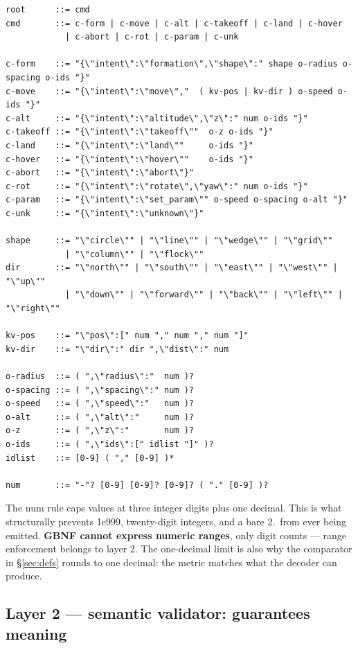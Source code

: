\documentclass[11pt,a4paper]{article}
\newcommand{\code}[1]{{\ttfamily\small #1}}
\begin{document}
\begin{lstlisting}[caption={cmd.gbnf --- the grammar that constrains decoding},captionpos=b]
root      ::= cmd
cmd       ::= c-form | c-move | c-alt | c-takeoff | c-land | c-hover
            | c-abort | c-rot | c-param | c-unk

c-form    ::= "{\"intent\":\"formation\",\"shape\":" shape o-radius o-spacing o-ids "}"
c-move    ::= "{\"intent\":\"move\","  ( kv-pos | kv-dir ) o-speed o-ids "}"
c-alt     ::= "{\"intent\":\"altitude\",\"z\":" num o-ids "}"
c-takeoff ::= "{\"intent\":\"takeoff\""  o-z o-ids "}"
c-land    ::= "{\"intent\":\"land\""     o-ids "}"
c-hover   ::= "{\"intent\":\"hover\""    o-ids "}"
c-abort   ::= "{\"intent\":\"abort\"}"
c-rot     ::= "{\"intent\":\"rotate\",\"yaw\":" num o-ids "}"
c-param   ::= "{\"intent\":\"set_param\"" o-speed o-spacing o-alt "}"
c-unk     ::= "{\"intent\":\"unknown\"}"

shape     ::= "\"circle\"" | "\"line\"" | "\"wedge\"" | "\"grid\""
            | "\"column\"" | "\"flock\""
dir       ::= "\"north\"" | "\"south\"" | "\"east\"" | "\"west\"" | "\"up\""
            | "\"down\"" | "\"forward\"" | "\"back\"" | "\"left\"" | "\"right\""

kv-pos    ::= "\"pos\":[" num "," num "," num "]"
kv-dir    ::= "\"dir\":" dir ",\"dist\":" num

o-radius  ::= ( ",\"radius\":"  num )?
o-spacing ::= ( ",\"spacing\":" num )?
o-speed   ::= ( ",\"speed\":"   num )?
o-alt     ::= ( ",\"alt\":"     num )?
o-z       ::= ( ",\"z\":"       num )?
o-ids     ::= ( ",\"ids\":[" idlist "]" )?
idlist    ::= [0-9] ( "," [0-9] )*

num       ::= "-"? [0-9] [0-9]? [0-9]? ( "." [0-9] )?
\end{lstlisting}

The \code{num} rule caps values at three integer digits plus one decimal. This is what structurally
prevents \code{1e999}, twenty-digit integers, and a bare \code{2.}\ from ever being emitted. \textbf{GBNF
cannot express numeric ranges}, only digit counts --- range enforcement belongs to layer 2. The one-decimal
limit is also why the comparator in \S\ref{sec:defs} rounds to one decimal: the metric matches what the
decoder can produce.

\subsection{Layer 2 --- semantic validator: guarantees meaning}
\end{document}
